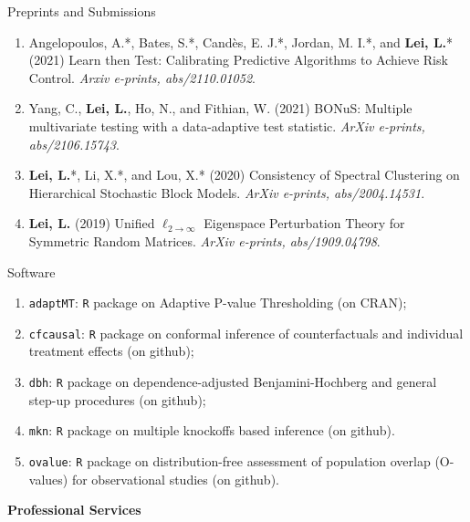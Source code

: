 \documentclass{article}
\begin{document}
\begin{large}
\noindent Preprints and Submissions
\end{large}

\begin{enumerate}
\item Angelopoulos, A.*, Bates, S.*, Cand\`{e}s, E. J.*, Jordan, M. I.*, and \textbf{Lei, L.}* (2021) Learn then Test: Calibrating Predictive Algorithms to Achieve Risk Control. \emph{Arxiv e-prints, abs/2110.01052}.
\item Yang, C., \textbf{Lei, L.}, Ho, N., and Fithian, W. (2021) BONuS: Multiple multivariate testing with a data-adaptive test statistic. \emph{ArXiv e-prints, abs/2106.15743}.
\item \textbf{Lei, L.}*, Li, X.*, and Lou, X.* (2020) Consistency of Spectral Clustering on Hierarchical Stochastic Block Models. \emph{ArXiv e-prints, abs/2004.14531}.
\item \textbf{Lei, L.} (2019) Unified $\ell_{2\rightarrow\infty}$ Eigenspace Perturbation Theory for Symmetric Random Matrices. \emph{ArXiv e-prints, abs/1909.04798}.
\end{enumerate}

\begin{large}
\noindent Software
\end{large}

\begin{enumerate}
\item \texttt{adaptMT}: \texttt{R} package on Adaptive P-value Thresholding (on CRAN);
\item \texttt{cfcausal}: \texttt{R} package on conformal inference of counterfactuals and individual treatment effects (on github);
\item \texttt{dbh}: \texttt{R} package on dependence-adjusted Benjamini-Hochberg and general step-up procedures (on github);
\item \texttt{mkn}: \texttt{R} package on multiple knockoffs based inference (on github).
\item \texttt{ovalue}: \texttt{R} package on distribution-free assessment of population overlap (O-values) for observational studies (on github).
\end{enumerate}

\vspace{5mm}
\begin{large}
\noindent \textbf{Professional Services}
\end{large}
\vspace{5mm}
\end{document}

